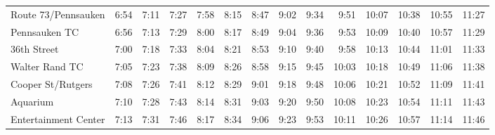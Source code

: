 \begin{center}
\begin{tabular}{@{}lrrrrrrrrrrrrr@{}}
Route 73/Pennsauken & 6:54 & 7:11 & 7:27 & 7:58 & 8:15 & 8:47 & 9:02 & 9:34 & 9:51 & 10:07 & 10:38 & 10:55 & 11:27 \\
Pennsauken TC & 6:56 & 7:13 & 7:29 & 8:00 & 8:17 & 8:49 & 9:04 & 9:36 & 9:53 & 10:09 & 10:40 & 10:57 & 11:29 \\
36th Street & 7:00 & 7:18 & 7:33 & 8:04 & 8:21 & 8:53 & 9:10 & 9:40 & 9:58 & 10:13 & 10:44 & 11:01 & 11:33 \\
Walter Rand TC & 7:05 & 7:23 & 7:38 & 8:09 & 8:26 & 8:58 & 9:15 & 9:45 & 10:03 & 10:18 & 10:49 & 11:06 & 11:38 \\
Cooper St/Rutgers & 7:08 & 7:26 & 7:41 & 8:12 & 8:29 & 9:01 & 9:18 & 9:48 & 10:06 & 10:21 & 10:52 & 11:09 & 11:41 \\
Aquarium & 7:10 & 7:28 & 7:43 & 8:14 & 8:31 & 9:03 & 9:20 & 9:50 & 10:08 & 10:23 & 10:54 & 11:11 & 11:43 \\
Entertainment Center & 7:13 & 7:31 & 7:46 & 8:17 & 8:34 & 9:06 & 9:23 & 9:53 & 10:11 & 10:26 & 10:57 & 11:14 & 11:46 \\
\bottomrule\end{tabular}\end{center}
